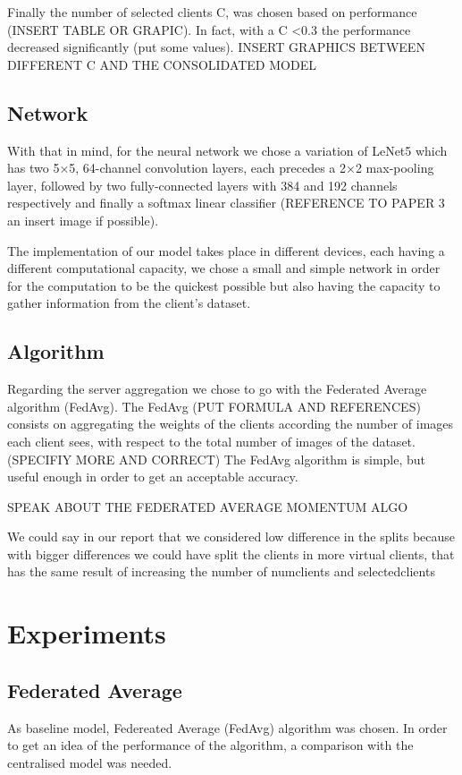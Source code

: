 \documentclass[twocolumn]{article}
\begin{document}
Finally the number of selected clients C, was chosen based on performance (INSERT TABLE OR GRAPIC). In fact, with a C <0.3 the performance decreased significantly (put some values).
INSERT GRAPHICS BETWEEN DIFFERENT C AND THE CONSOLIDATED MODEL

\subsection{Network}

With that in mind, for the neural network we chose a variation of LeNet5 which has two 5×5, 64-channel convolution layers, each precedes a 2×2 max-pooling layer, followed by two fully-connected layers with 384 and 192 channels respectively and finally a softmax linear classifier (REFERENCE TO PAPER 3 an insert image if possible). 

The implementation of our model takes place in different devices, each having a different computational capacity, we chose a small and simple network in order for the computation to be the quickest possible but also having the capacity to gather information from the client's dataset.

\subsection{Algorithm}
Regarding the server aggregation we chose to go with the Federated Average algorithm (FedAvg). The FedAvg (PUT FORMULA AND REFERENCES) consists on aggregating the weights of the clients according the number of images each client sees, with respect to the total number of images of the dataset.(SPECIFIY MORE AND CORRECT)
The FedAvg algorithm is simple, but useful enough in order to get an acceptable accuracy.

SPEAK ABOUT THE FEDERATED AVERAGE MOMENTUM ALGO

We could say in our report that we considered low difference in the splits because with bigger differences we could have split  the clients in more virtual clients, that has the same result of increasing the number of numclients and selectedclients

\section{Experiments} %
\subsection{Federated Average}
As baseline model, Federeated Average (FedAvg) algorithm was chosen. In order to get an idea of the performance of the algorithm, a comparison with the centralised model was needed. 
\end{document}

